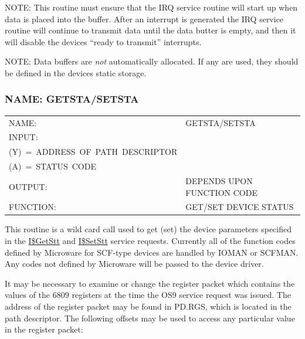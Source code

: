 \documentclass[
]{article}
\newcounter{none} %
\begin{document}
NOTE: This routine must ensure that the IRQ service routine will start
up when data is placed into the buffer. After an interrupt is generated
the IRQ service routine will continue to transmit data until the data
butter is empty, and then it will disable the device\textquotesingle s
``ready to transmit'' interrupts.

NOTE: Data buffers are \emph{not} automatically allocated. If any are
used, they should be defined in the device\textquotesingle s static
storage.

\subsubsection{NAME: GETSTA/SETSTA}

{\def\LTcaptype{none} %
\begin{longtable}[]{@{}
  >{\raggedright\arraybackslash}p{}
  >{\raggedright\arraybackslash}p{}@{}}
\toprule\noalign{}
\endhead
\bottomrule\noalign{}
\endlastfoot
NAME: & GETSTA/SETSTA \\
INPUT: & \begin{minipage}[t]{\linewidth}\raggedright
(U)~=~ADDRESS~OF~DEVICE~STATIC~STORAGE\\
(Y)~=~ADDRESS~OF~PATH~DESCRIPTOR\\
(A)~=~STATUS~CODE
\end{minipage} \\
OUTPUT: & DEPENDS UPON FUNCTION CODE \\
FUNCTION: & GET/SET DEVICE STATUS \\
\end{longtable}
}

This routine is a wild card call used to get (set) the device parameters
specified in the \hyperref[i.getstt]{I\$GetStt} and
\hyperref[i.setstt]{I\$SetStt} service requests. Currently all of the
function codes defined by Microware for SCF-type devices are handled by
IOMAN or SCFMAN. Any codes not defined by Microware will be passed to
the device driver.

It may be necessary to examine or change the register packet which
contains the values of the 6809 registers at the time the OS9 service
request was issued. The address of the register packet may be found in
PD.RGS, which is located in the path descriptor. The following offsets
may be used to access any particular value in the register packet:
\end{document}
